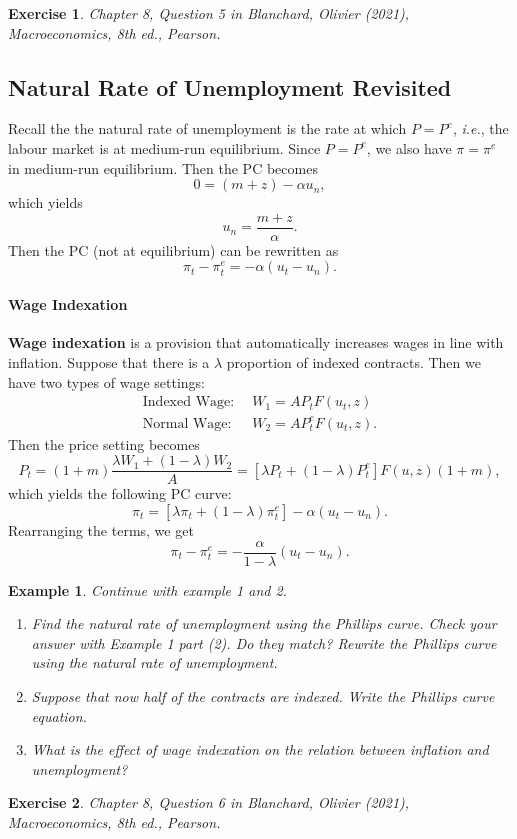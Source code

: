 \documentclass[12pt]{article}
\newtheorem{example}{Example}
\newtheorem{exercise}{Exercise}
\begin{document}
\begin{exercise}
    Chapter 8, Question 5 in Blanchard, Olivier (2021), \textit{Macroeconomics}, 8th ed., Pearson.
\end{exercise}

\subsection*{Natural Rate of Unemployment Revisited}
Recall the the natural rate of unemployment is the rate at which $P=P^e$, \textit{i.e.}, the labour market is at medium-run equilibrium. Since $P=P^e$, we also have $\pi=\pi^e$ in medium-run equilibrium. Then the PC becomes
\[0 = (m+z)-\alpha u_n,\]
which yields
\[u_n = \frac{m+z}{\alpha}.\]
Then the PC (not at equilibrium) can be rewritten as
\[\pi_t - \pi_t^e = -\alpha (u_t - u_n).\]

\paragraph{Wage Indexation}
\textbf{Wage indexation} is a provision that automatically increases wages in line with inflation. Suppose that there is a $\lambda$ proportion of indexed contracts. Then we have two types of wage settings:
\begin{align*}
    \text{Indexed Wage: }\, & W_1 = A P_t F(u_t,z)\\
    \text{Normal Wage: }\, & W_2 = A P^e_t F(u_t,z).
\end{align*}
Then the price setting becomes
\[P_t = (1+m)\frac{\lambda W_1 + (1-\lambda) W_2}{A} = [\lambda P_t + (1-\lambda)P_t^e] F(u,z)(1+m),\]
which yields the following PC curve:
\[\pi_t = [\lambda\pi_t + (1-\lambda)\pi_t^e]-\alpha(u_t-u_n).\]
Rearranging the terms, we get
\[\pi_t-\pi_t^e = -\frac{\alpha}{1-\lambda}(u_t-u_n).\]

\begin{example}
    Continue with example 1 and 2.
    \begin{enumerate}[label=(\arabic*)]
        \item Find the natural rate of unemployment using the Phillips curve. Check your answer with Example 1 part (2). Do they match? Rewrite the Phillips curve using the natural rate of unemployment.
        \vspace{60pt}
        \item Suppose that now half of the contracts are indexed. Write the Phillips curve equation.
        \vspace{60pt}
        \item What is the effect of wage indexation on the relation between inflation and unemployment?
        \vspace{60pt}
    \end{enumerate}
\end{example}

\begin{exercise}
    Chapter 8, Question 6 in Blanchard, Olivier (2021), \textit{Macroeconomics}, 8th ed., Pearson.
\end{exercise}
\end{document}
